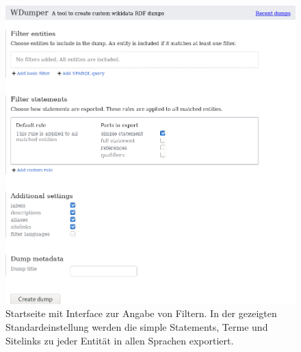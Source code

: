 \begin{figure}
  \includegraphics[width=\textwidth]{pics/screen-main}
  \caption{Startseite mit Interface zur Angabe von Filtern. In der gezeigten Standardeinstellung werden die simple Statements, Terme und Sitelinks zu jeder Entität in allen Sprachen exportiert.}
  \label{fig:screen-main}
\end{figure}
